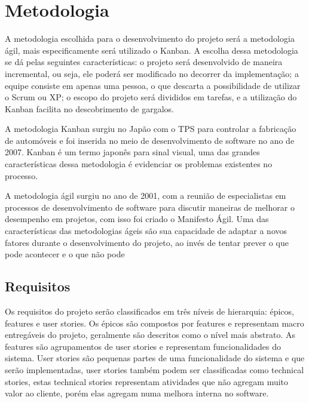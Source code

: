 \chapter[Metodologia]{Metodologia}
A metodologia escolhida para o desenvolvimento do projeto será a metodologia ágil, mais especificamente será utilizado o Kanban. A escolha dessa metodologia se dá pelas seguintes características: o projeto será desenvolvido de maneira incremental, ou seja, ele poderá ser modificado no decorrer da implementação; a equipe consiste em apenas uma pessoa, o que descarta a possibilidade de utilizar o Scrum ou XP; o escopo do projeto será divididos em tarefas, e a utilização do Kanban facilita no descobrimento de gargalos.

A metodologia Kanban surgiu no Japão com o TPS\cite{tps} para controlar a fabricação de automóveis e foi inserida no meio de desenvolvimento de software no ano de 2007. Kanban é um termo japonês para sinal visual, uma das grandes características dessa metodologia é evidenciar os problemas existentes no processo. 

A metodologia ágil surgiu no ano de 2001, com a reunião de especialistas em processos de desenvolvimento de software para discutir maneiras de melhorar o desempenho em projetos, com isso foi criado o Manifesto Ágil\cite{agil}. Uma das características das metodologias ágeis são sua capacidade de adaptar a novos fatores durante o desenvolvimento do projeto, ao invés de tentar prever o que pode acontecer e o que não pode
\section{Requisitos}
Os requisitos do projeto serão classificados em três níveis de hierarquia:  épicos, features e user stories. Os épicos são compostos por features e representam macro entregáveis do projeto, geralmente são descritos como o nível mais abstrato. As features são agrupamentos de user stories e representam funcionalidades do sistema. User stories são pequenas partes de uma funcionalidade do sistema e que serão implementadas, user stories também podem ser classificadas como technical stories, estas technical stories representam atividades que não agregam muito valor ao cliente, porém elas agregam numa melhora interna no software.

